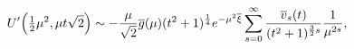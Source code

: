 \[\mathop{U\/}\nolimits'\!\left(\tfrac{1}{2}\mu^{2},\mu t\sqrt{2}\right)\sim{-%
\frac{\mu}{\sqrt{2}}\overline{g}(\mu)(t^{2}+1)^{\frac{1}{4}}e^{-\mu^{2}{%
\overline{\xi}}}\sum_{s=0}^{\infty}\frac{\overline{v}_{s}(t)}{(t^{2}+1)^{\frac%
{3}{2}s}}\frac{1}{\mu^{2s}}},\]
